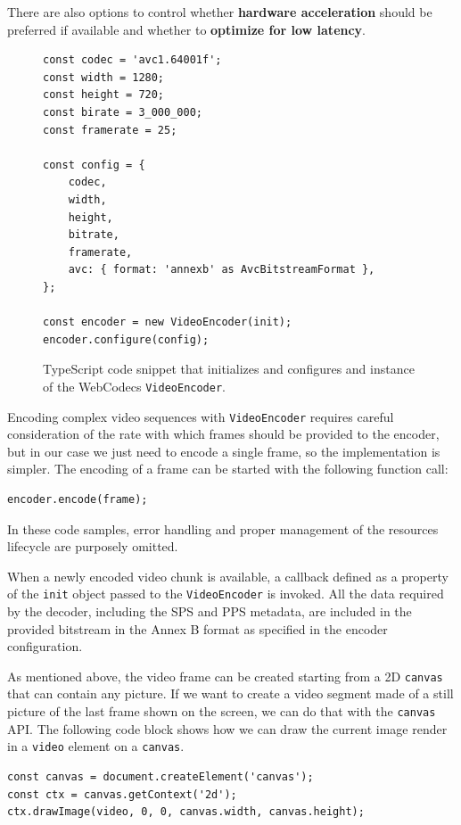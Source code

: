 There are also options to control whether \textbf{hardware acceleration} should be preferred if available and whether to \textbf{optimize for low latency}.

\begin{figure}
    \centering
    \begin{verbatim}
const codec = 'avc1.64001f';
const width = 1280;
const height = 720;
const birate = 3_000_000;
const framerate = 25;

const config = {
    codec,
    width,
    height,
    bitrate,
    framerate,
    avc: { format: 'annexb' as AvcBitstreamFormat },
};

const encoder = new VideoEncoder(init);
encoder.configure(config);
\end{verbatim}
    \caption{TypeScript code snippet that initializes and configures and instance of the WebCodecs \texttt{VideoEncoder}.}
    \label{fig:webcodecs_videoencoder}
\end{figure}

Encoding complex video sequences with \texttt{VideoEncoder} requires careful consideration of the rate with which frames should be provided to the encoder, but in our case we just need to encode a single frame, so the implementation is simpler. The encoding of a frame can be started with the following function call:

\begin{verbatim}
encoder.encode(frame);
\end{verbatim}

In these code samples, error handling and proper management of the resources lifecycle are purposely omitted.

When a newly encoded video chunk is available, a callback defined as a property of the \texttt{init} object passed to the \texttt{VideoEncoder} is invoked. All the data required by the decoder, including the SPS and PPS metadata, are included in the provided bitstream in the Annex B format as specified in the encoder configuration.

As mentioned above, the video frame can be created starting from a 2D \texttt{canvas} that can contain any picture. If we want to create a video segment made of a still picture of the last frame shown on the screen, we can do that with the \texttt{canvas} API. The following code block shows how we can draw the current image render in a \texttt{video} element on a \texttt{canvas}.

\begin{verbatim}
const canvas = document.createElement('canvas');
const ctx = canvas.getContext('2d');
ctx.drawImage(video, 0, 0, canvas.width, canvas.height);
\end{verbatim}

